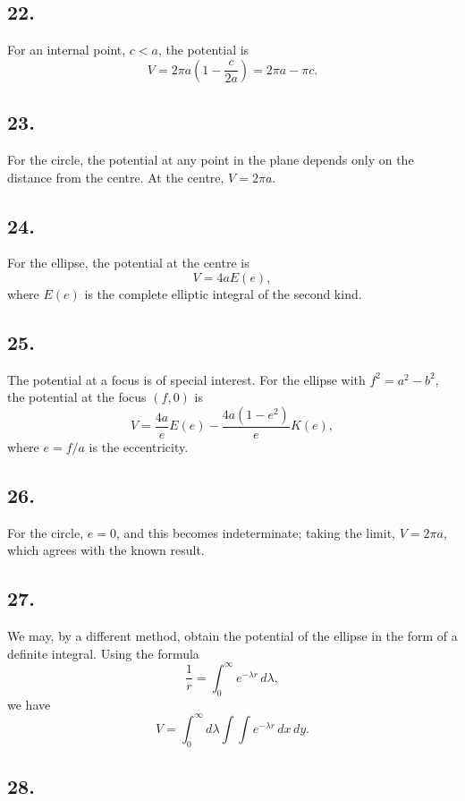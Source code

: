 \documentclass[11pt,a4paper]{article}
\begin{document}
\subsection*{22.}

For an internal point, $c<a$, the potential is
\[
V = 2\pi a\left(1-\frac{c}{2a}\right) = 2\pi a - \pi c.
\]

\subsection*{23.}

For the circle, the potential at any point in the plane depends only on the
distance from the centre. At the centre, $V=2\pi a$.

\subsection*{24.}

For the ellipse, the potential at the centre is
\[
V = 4aE(e),
\]
where $E(e)$ is the complete elliptic integral of the second kind.

\newpage
\subsection*{25.}

The potential at a focus is of special interest. For the ellipse with
$f^2=a^2-b^2$, the potential at the focus $(f,0)$ is
\[
V = \frac{4a}{e}E(e) - \frac{4a(1-e^2)}{e}K(e),
\]
where $e=f/a$ is the eccentricity.

\subsection*{26.}

For the circle, $e=0$, and this becomes indeterminate; taking the limit,
$V=2\pi a$, which agrees with the known result.

\subsection*{27.}

We may, by a different method, obtain the potential of the ellipse in the
form of a definite integral. Using the formula
\[
\frac{1}{r} = \int_0^{\infty} e^{-\lambda r}\,d\lambda,
\]
we have
\[
V = \int_0^{\infty} d\lambda \int\!\!\!\int e^{-\lambda r}\,dx\,dy.
\]

\subsection*{28.}
\end{document}
